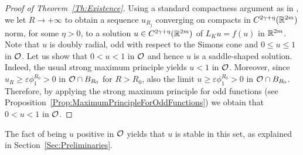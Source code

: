 \begin{proof}[Proof of Theorem~\ref{Th:Existence}]
	Using a standard compactness argument as in \cite{FelipeSanz-Perela:IntegroDifferentialI}, we let $R\to +\infty$ to obtain a sequence $u_{R_j}$ converging on compacts in  $C^{2\gamma + \eta}(\mathbb{R}^{2m})$ norm, for some $\eta > 0$, to a solution $u \in C^{2\gamma + \eta}(\mathbb{R}^{2m})$ of $L_K u = f(u)$ in $\mathbb{R}^{2m}$. Note that $u$ is doubly radial, odd with respect to the Simons cone and $0\leq u \leq 1$ in $\mathcal{O}$. Let us show that $0 < u < 1$ in $\mathcal{O}$ and hence $u$ is a saddle-shaped solution. Indeed, the usual strong maximum principle yields $u<1$ in $\mathcal{O}$. Moreover, since $u_R\geq\varepsilon \phi_1^{R_0}>0$ in  $\mathcal{O} \cap B_{R_0}$ for $R>R_0$, also the limit $u\geq\varepsilon \phi_1^{R_0}>0$ in  $\mathcal{O} \cap B_{R_0}$. Therefore, by applying the strong maximum principle for odd functions (see Proposition~\ref{Prop:MaximumPrincipleForOddFunctions}) we obtain that $0 < u < 1$ in $\mathcal{O}$.
\end{proof}


\begin{remark}
	The fact of being $u$ positive in $\mathcal{O}$ yields that $u$ is stable in this set, as explained in Section~\ref{Sec:Preliminaries}. 
\end{remark}






